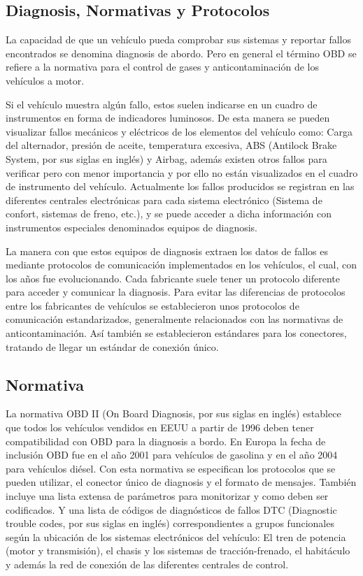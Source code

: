 \subsection{Diagnosis, Normativas y Protocolos}

La capacidad de que un vehículo pueda comprobar sus sistemas y reportar fallos encontrados se denomina diagnosis de abordo. Pero en general el término OBD se refiere a la normativa para el control de gases y anticontaminación de los vehículos a motor.

Si el vehículo muestra algún fallo, estos suelen indicarse en un cuadro de instrumentos en forma de indicadores luminosos. De esta manera se pueden visualizar fallos mecánicos y eléctricos de los elementos del vehículo como: Carga del alternador, presión de aceite, temperatura excesiva, ABS (Antilock Brake System, por sus siglas en inglés) y Airbag, además existen otros fallos para verificar pero con menor importancia y por ello no están visualizados en el cuadro de instrumento del vehículo. Actualmente los fallos producidos se registran en las diferentes centrales electrónicas para cada sistema electrónico (Sistema de confort, sistemas de freno, etc.),  y se puede acceder a dicha información con instrumentos especiales denominados equipos de diagnosis.

La manera con que estos equipos de diagnosis  extraen los datos de fallos es mediante protocolos  de comunicación implementados en los vehículos, el cual, con los años fue evolucionando. Cada fabricante suele tener un protocolo diferente para acceder y comunicar la diagnosis. Para evitar las diferencias de protocolos entre los fabricantes de vehículos se establecieron unos protocolos de comunicación estandarizados, generalmente relacionados con las normativas de anticontaminación. Así también se establecieron estándares para los conectores, tratando de llegar un estándar de conexión único. 

\subsection{Normativa}

La normativa OBD II (On Board Diagnosis, por sus siglas en inglés) establece que todos los vehículos vendidos en EEUU a partir de 1996 deben tener compatibilidad con OBD para la diagnosis a bordo. En Europa la fecha de inclusión OBD fue en el año 2001 para vehículos de gasolina y en el año 2004 para vehículos diésel. Con esta normativa se especifican los protocolos que se pueden utilizar, el conector único de diagnosis y el formato de mensajes.
También incluye una lista extensa de parámetros para monitorizar  y como deben ser codificados. Y una lista de códigos de diagnósticos de fallos DTC (Diagnostic trouble codes, por sus siglas en inglés) correspondientes a grupos funcionales según la ubicación de los sistemas electrónicos del vehículo: El tren de potencia (motor y transmisión), el chasis y los sistemas de tracción-frenado, el habitáculo y  además la red de conexión de las diferentes centrales de control.

